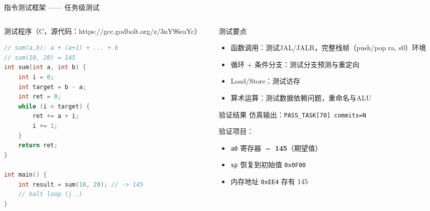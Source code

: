 \documentclass[aspectratio=169,xcolor={dvipsnames,svgnames},10pt]{beamer}
\newcommand{\code}[1]{\texttt{\small\color{PrimaryBlue}#1}}
\begin{document}
\begin{frame}[fragile,shrink=6]{指令测试框架 —— 任务级测试}
  \begin{columns}[T]
    \begin{column}{0.50\textwidth}
      \begin{block}{测试程序（C，源代码：https://gcc.godbolt.org/z/3nY96eaYc）}
\begin{lstlisting}[language=C]
// sum(a,b): a + (a+1) + ... + b
// sum(10, 20) = 145
int sum(int a, int b) {
    int i = 0;
    int target = b - a;
    int ret = 0;
    while (i < target) {
        ret += a + i;
        i += 1;
    }
    return ret;
}

int main() {
    int result = sum(10, 20); // -> 145
    // halt loop (j .)
}
\end{lstlisting}
      \end{block}
    \end{column}
    \begin{column}{0.46\textwidth}
      \begin{block}{测试要点}
        \small
        \begin{itemize}
          \item 函数调用：测试JAL/JALR，完整栈帧（push/pop ra, s0）环境
          \item 循环 + 条件分支：测试分支预测与重定向
          \item Load/Store：测试访存
          \item 算术运算：测试数据依赖问题，重命名与ALU

        \end{itemize}
      \end{block}
      \vspace{0.15cm}
      \begin{exampleblock}{验证结果}
        \small
        仿真输出：\code{PASS\_TASK[70] commits=N}

        验证项目：
        \begin{itemize}
          \item \code{a0} 寄存器 $=$ \textcolor{AccentGreen}{\textbf{145}}（期望值）
          \item \code{sp} 恢复到初始值 \code{0x0F00}
          \item 内存地址 \code{0xEE4} 存有 145
        \end{itemize}
      \end{exampleblock}
    \end{column}
  \end{columns}
\end{frame}
\end{document}
